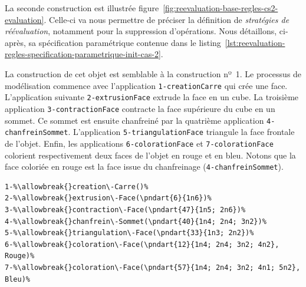 La seconde construction est illustrée
figure~\ref{fig:reevaluation-base-regles-cs2-evaluation}. %
Celle-ci va nous permettre de préciser la définition de \textit{stratégies
	de réévaluation}, notamment pour la suppression d'opérations. %
Nous détaillons, ci-après, sa spécification paramétrique contenue dans le
listing~\ref{lst:reevaluation-regles-specification-parametrique-init-cas-2}. %


La construction de cet objet est semblable à la construction nº~1. %
Le processus de modélisation commence avec l'application \texttt{1-\allowbreak{}creation\-Carre}
qui crée une face. %
L'application suivante \texttt{2-\allowbreak{}extrusion\-Face} extrude la face en un cube. %
La troisième application \texttt{3-\allowbreak{}contraction\-Face} contracte la face supérieure du
cube en un sommet. %
Ce sommet est ensuite chanfreiné par la quatrième application
\texttt{4-\allowbreak{}chanfrein\-Sommet}. %
L'application \texttt{5-\allowbreak{}triangulation\-Face} triangule la face frontale de l'objet. %
Enfin, les applications \texttt{6-\allowbreak{}coloration\-Face} et \texttt{7-\allowbreak{}coloration\-Face} colorient respectivement
deux faces de l'objet en rouge et en bleu. %
Notons que la face coloriée en rouge est la face issue du chanfreinage
(\texttt{4-\allowbreak{}chanfrein\-Sommet}). %

\begin{lstlisting}[escapechar=\%,
style=script-style,
caption=Spécification paramétrique initiale du cas nº~2,
label=lst:reevaluation-regles-specification-parametrique-init-cas-2,
captionpos=b]
1-%\allowbreak{}creation\-Carre()%
2-%\allowbreak{}extrusion\-Face(\pndart{6}{1n6})%
3-%\allowbreak{}contraction\-Face(\pndart{47}{1n5; 2n6})%
4-%\allowbreak{}chanfrein\-Sommet(\pndart{40}{1n4; 2n4; 3n2})%
5-%\allowbreak{}triangulation\-Face(\pndart{33}{1n3; 2n2})%
6-%\allowbreak{}coloration\-Face(\pndart{12}{1n4; 2n4; 3n2; 4n2}, Rouge)%
7-%\allowbreak{}coloration\-Face(\pndart{57}{1n4; 2n4; 3n2; 4n1; 5n2}, Bleu)%
\end{lstlisting}

